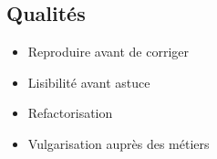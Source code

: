 \subsection*{\textcolor{maincolor}{} Qualités}
\small
\begin{itemize}[leftmargin=2pt, itemsep=1pt, label={}]
    \item Reproduire avant de corriger
    \item Lisibilité avant astuce
    \item Refactorisation
    \item Vulgarisation auprès des métiers
\end{itemize}
